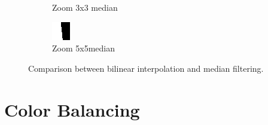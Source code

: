 \documentclass[a4paper]{article}
\begin{document}
\begin{figure}[H]
\begin{subfigure}[h]{0.32\textwidth}
		\caption*{Zoom 3x3 median}
	\end{subfigure}
	\begin{subfigure}[h]{0.32\textwidth}
		\centering
		\includegraphics[width=\textwidth]{black_and_white_median_filtered_5x5_zoom}
		\caption*{Zoom 5x5median}
	\end{subfigure}
\caption{Comparison between bilinear interpolation and median filtering.}
\label{fig:calanque}
\end{figure}
\section{Color Balancing}
\end{document}
